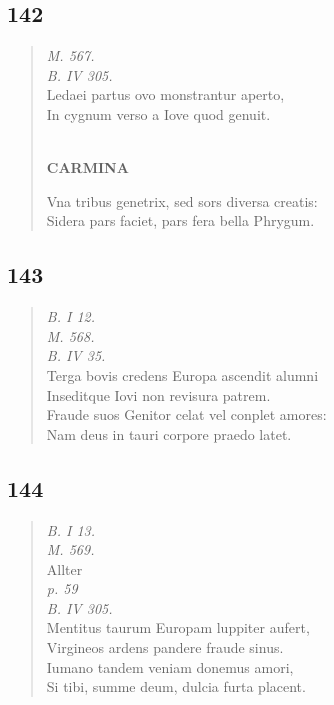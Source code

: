 \documentclass[11pt, a4paper]{report}
\begin{document}
            \subsection*{142}
      \begin{verse}
      \textit{M. 567.} \\ \textit{B. IV 305.} \\ Ledaei partus ovo monstrantur aperto, \\ In cygnum verso a Iove quod genuit. \\ 
        ﻿\pagebreak 
     \marginpar{[142]} \begin{center} \textbf{CARMINA} \end{center}Vna tribus genetrix, sed sors diversa creatis: \\ Sidera pars faciet, pars fera bella Phrygum. \\ 
      \end{verse}
  
            \subsection*{143}
      \begin{verse}
      \textit{B. I 12.} \\ \textit{M. 568.} \\ \textit{B. IV 35.} \\ Terga bovis credens Europa ascendit alumni \\ Inseditque Iovi non revisura patrem. \\ Fraude suos Genitor celat vel conplet amores: \\ Nam deus in tauri corpore praedo latet. \\ 
      \end{verse}
  
            \subsection*{144}
      \begin{verse}
      \textit{B. I 13.} \\ \textit{M. 569.} \\ Allter \\ \textit{p. 59} \\ \textit{B. IV 305.} \\ Mentitus taurum Europam luppiter aufert, \\ Virgineos ardens pandere fraude sinus. \\ Iumano tandem veniam donemus amori, \\ Si tibi, summe deum, dulcia furta placent. \\ 
      \end{verse}
  
\end{document}

